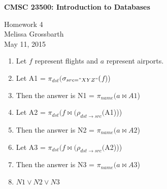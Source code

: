 \documentclass{article}[12pt]
\newcommand{\assignment}{Homework 4}
\newcommand{\whoami}{Melissa Grossbarth}
\newcommand{\assignmentdate}{May 11, 2015}
\newcommand{\rel}[1]{\ensuremath{#1}}
\newcommand{\disj}[2]{\ensuremath{#1 \vee #2}}
\newcommand{\nj}[2]{\ensuremath{#1 \bowtie #2}}
\newcommand{\sel}[2]{\ensuremath{\sigma_{#1} #2}}
\newcommand{\proj}[2]{\ensuremath{\pi_{#1} #2}}
\newcommand{\ren}[2]{\ensuremath{\rho_{#1} #2}}
\begin{document}
{\large \bf CMSC 23500: Introduction to Databases}

\assignment \\
\whoami \\
\assignmentdate

\hrulefill


\begin{enumerate}

\item[]Let \rel{f} represent flights and \rel{a} represent airports.

\item Let A1 = \proj{dst}({\sel{src="XYZ"}(\rel{f})})

\item[] Then the answer is N1 = \proj{name}(\nj{\rel{a}}{A1})

\item Let A2 = \proj{dst}(\nj{\rel{f}}({\ren{dst \rightarrow src} (A1)}))

\item[] Then the answer is N2 = \proj{name}(\nj{\rel{a}}{A2})

\item Let A3 = \proj{dst}(\nj{\rel{f}}({\ren{dst \rightarrow src} (A2)}))

\item[] Then the answer is N3 = \proj{name}(\nj{\rel{a}}{A3})

\item \disj{N1}{\disj{N2}{N3}}

\end{enumerate}
\end{document}
